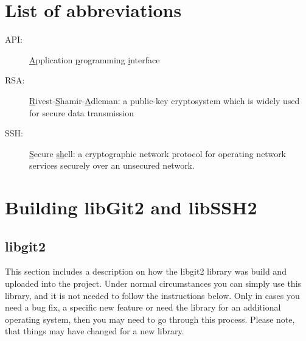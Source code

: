 \chapter*{List of abbreviations}
\begin{description}
\item [{API:}] \underline{A}pplication \underline{p}rogramming \underline{i}nterface
\item [{RSA:}] \underline{R}ivest-\underline{S}hamir-\underline{A}dleman: 
               a public-key cryptosystem which is widely used for secure data 
               transmission
\item [{SSH:}] \underline{S}ecure \underline{sh}ell: 
               a cryptographic network protocol for operating network services 
               securely over an unsecured network.
\end{description}

\chapter{Building libGit2 and libSSH2\label{chap:building_git2_ssh2}}
\section{libgit2}

This section includes a description on how the libgit2 library was build and 
uploaded into the project. Under normal circumstances you can simply use this
library, and it is not needed to follow the instructions below. Only in cases
you need a bug fix, a specific new feature or need the library for an additional
operating system, then you may need to go through this process. Please note, 
that things may have changed for a new library.

